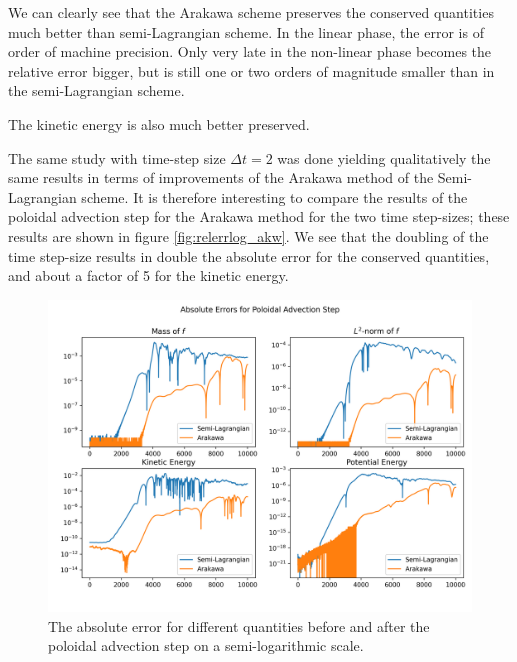 We can clearly see that the Arakawa scheme preserves the conserved quantities much better than semi-Lagrangian scheme. In the linear phase, the error is of order of machine precision. Only very late in the non-linear phase becomes the relative error bigger, but is still one or two orders of magnitude smaller than in the semi-Lagrangian scheme.

The kinetic energy is also much better preserved.

The same study with time-step size $\Delta t = 2$ was done yielding qualitatively the same results in terms of improvements of the Arakawa method of the Semi-Lagrangian scheme. It is therefore interesting to compare the results of the poloidal advection step for the Arakawa method for the two time step-sizes; these results are shown in figure \ref{fig:relerrlog_akw}. We see that the doubling of the time step-size results in double the absolute error for the conserved quantities, and about a factor of 5 for the kinetic energy.


\begin{figure}
	\centering
	\includegraphics[width=0.9\linewidth]{plots/abs_err_log}
	\caption{The absolute error for different quantities before and after the poloidal advection step on a semi-logarithmic scale.}
	\label{fig:abserrlog}
\end{figure}

